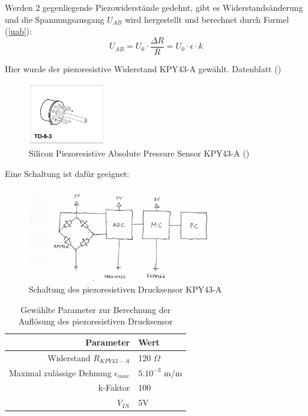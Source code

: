 \documentclass[12pt]{article}
\begin{document}
Werden 2 gegenliegende Piezowiderstände gedehnt, gibt es Widerstandsänderung und die Spannungsausgang $U_{AB}$ wird hergestellt und berechnet durch Formel (\ref{uab}):
\begin{equation}\label{uab}
    U_{AB} = U_0 \cdot \frac{\Delta R}{R} = U_0 \cdot \epsilon \cdot k
\end{equation} 

Hier wurde der piezoresistive Widerstand KPY43-A gewählt. Datenblatt (\cite{Siemens.2021})

\begin{figure}[h!]
  \centering
  \label{fig:kpy43a}
  \includegraphics[width=0.3\textwidth]{kpy43a}
  \caption{Silicon Piezoresistive Absolute Pressure Sensor KPY43-A (\cite{Siemens.2021})}
\end{figure}

Eine Schaltung ist dafür geeignet: 
  
\begin{figure}[h]
  \centering
  \label{fig:piezoschaltung}
  \includegraphics[width=0.8\textwidth]{schaltungpiezoresistiv}
  \caption{Schaltung des piezoresistiven Drucksensor KPY43-A}
\end{figure}

\begin{table}[h]
  \caption{\normalsize{Gewählte Parameter zur Berechnung der Auflösung des piezoresistiven Drucksensor}}
  \begin{center}
    \begin{tabular}{r|l}
    Parameter & Wert \\
    \hline
    Widerstand $R_{KPY43-A}$ & 120 $\Omega$ \\
    Maximal zulässige Dehnung $\epsilon_{max}$  & $5.10^{-3}$ m/m \\
    k-Faktor & 100 \\
    $V_{IN}$ & 5V \\
    \end{tabular} 
  \end{center}
\end{table}
\end{document}
